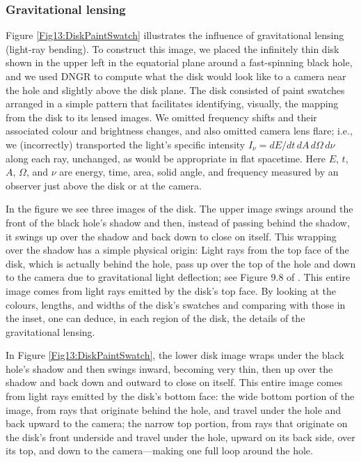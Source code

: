 \documentclass[12pt]{iopart}
\begin{document}
\subsubsection{Gravitational lensing}
\label{subsec:DiskLensing}

Figure \ref{Fig13:DiskPaintSwatch} illustrates the influence of gravitational lensing (light-ray bending).
To construct this image, we placed the infinitely thin disk shown in the upper left
in the equatorial plane around a fast-spinning black hole, and we used DNGR to compute what the disk
would look like to a camera near the hole and slightly above the disk plane.  The disk consisted of paint swatches arranged in a simple pattern that
facilitates identifying, visually, the mapping from the disk to its lensed images. We omitted frequency shifts and their associated colour and brightness changes, and also omitted camera  
lens flare; i.e., we (incorrectly) transported the light's specific intensity
$
I_\nu = dE/dt\, dA\, d\Omega\, d\nu
$
along each ray, unchanged, as would be appropriate in flat spacetime.  Here $E$, $t$, $A$, $\Omega$, and $\nu$ are energy, time, area,
solid angle, and frequency measured by an observer just above the disk or at the
camera.

In the figure we see three  images of the disk.  The upper image swings around
the front of the black hole's shadow and then, instead of passing behind the shadow, it
swings up over the shadow and back down to close on itself.  This wrapping over the
shadow has a simple physical origin:  Light rays from the top face of the disk, which is
actually behind the hole, pass up over the top of the hole and down to the camera 
due to gravitational light deflection; see Figure 9.8 of \cite{TSI}.  This entire image comes
from light rays emitted by the disk's top face.  By looking at the colours, lengths, and widths of the disk's swatches and comparing with those in the inset, one can deduce,
in each region of the disk, the details of the gravitational lensing.

In Figure \ref{Fig13:DiskPaintSwatch}, the lower disk image wraps under the black hole's shadow and then swings inward, becoming very thin, then up over the shadow and back down and outward to close on itself.  This entire image comes from light rays emitted by the 
disk's bottom face: the wide bottom portion of the image, from rays that originate behind the hole, and
travel under the hole and back upward to the camera; the narrow top portion, from rays
that originate on the disk's front underside and travel under the hole, upward on its back
side, over its top, and down to the camera---making one full loop around
the hole.
\end{document}
